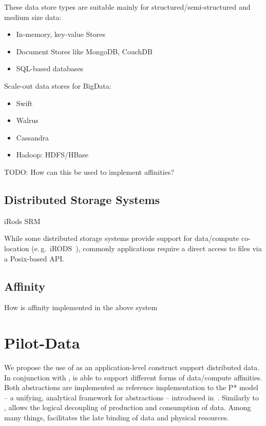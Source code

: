 \documentclass[conference]{IEEEtran}
\begin{document}
These data store types are suitable mainly for structured/semi-structured and 
medium size data:
\begin{itemize}
	\item In-memory, key-value Stores
	\item Document Stores like MongoDB, CouchDB 
	\item SQL-based databases
\end{itemize}

Scale-out data stores for BigData:
\begin{itemize}
	\item Swift
	\item Walrus
	\item Cassandra
	\item Hadoop: HDFS/HBase
\end{itemize}

TODO: How can this be used to implement affinities?


\subsection{Distributed Storage Systems}

iRods
SRM


While some distributed storage systems provide support for data/compute 
co-location (e.\,g.\ iRODS~\cite{Rajasekar:2010:IPI:1855046}), commonly 
applications require a direct access to files via a Posix-based API.

\subsection{Affinity}

How is affinity implemented in the above system



\section{Pilot-Data}

We propose the use of \pilotdata as an application-level construct support
distributed data. In conjunction with \pilotjob, \pilotdata is able to support
different forms of data/compute affinities. Both abstractions are implemented
as reference implementation to the P* model -- a unifying, analytical
framework for \pilot abstractions -- introduced in~\cite{pstar11}. 
Similarly to \pilotjobs, \pilotdata allows the logical decoupling
of production and consumption of data. Among many things, \pilotdata 
facilitates the late binding of data and physical resources.  
\end{document}
